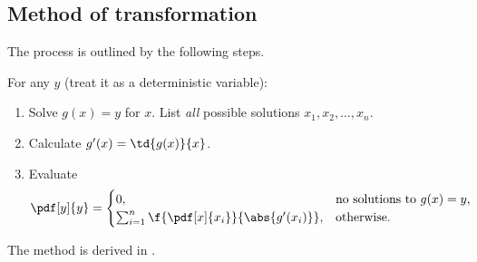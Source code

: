 \subsection{Method of transformation}
The process is outlined by the following steps. 

\begin{myBlackBox}
    For any $y$ (treat it as a deterministic variable):
    \begin{enumerate}
        \item Solve $g(x)=y$ for $x$. List \emph{all} possible solutions $x_{1},x_{2},\ldots,x_{n}$.
        \item Calculate $g'(x) = \td{g(x)}{x}$.
        \item Evaluate 
        \begin{align}
            \pdf[y]{y}
            &= 
            \begin{cases}
                0, &\text{no solutions to }g(x)=y,\\
                \sum_{i=1}^{n} \f{\pdf[x]{x_{i}}}{\abs{g'(x_{i})}}, &\text{otherwise}.
            \end{cases}
        \end{align}
    \end{enumerate}
\end{myBlackBox}
The method is derived in \cite[Sec.~2.6.2]{murphy_machine_2012}. 

